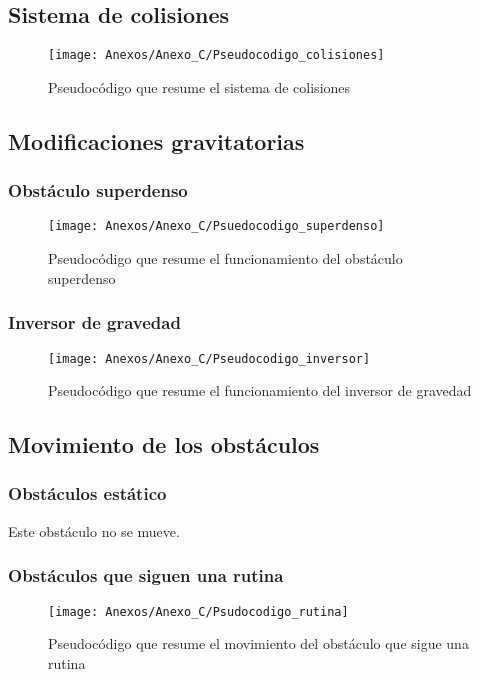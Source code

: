 \subsection{Sistema de colisiones}

\begin{figure}[h]
\centering
\texttt{[image: Anexos/Anexo\_C/Pseudocodigo\_colisiones]}
\caption{Pseudocódigo que resume el sistema de colisiones}
\end{figure}
\clearpage

\subsection{Modificaciones gravitatorias}
\subsubsection{Obstáculo superdenso}

\begin{figure}[h]
\centering
\texttt{[image: Anexos/Anexo\_C/Psuedocodigo\_superdenso]}
\caption{Pseudocódigo que resume el funcionamiento del obstáculo superdenso}
\end{figure}

\subsubsection{Inversor de gravedad}

\begin{figure}[h]
\centering
\texttt{[image: Anexos/Anexo\_C/Pseudocodigo\_inversor]}
\caption{Pseudocódigo que resume el funcionamiento del inversor de gravedad}
\end{figure}

\subsection{Movimiento de los obstáculos}
\subsubsection{Obstáculos estático}
Este obstáculo no se mueve.

\clearpage
\subsubsection{Obstáculos que siguen una rutina}

\begin{figure}[h]
\centering
\texttt{[image: Anexos/Anexo\_C/Psudocodigo\_rutina]}
\caption{Pseudocódigo que resume el movimiento del obstáculo que sigue una rutina}
\end{figure}

